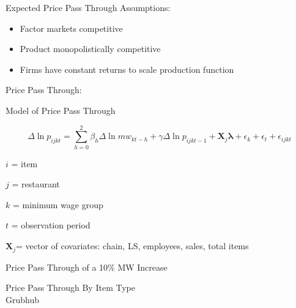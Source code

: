 \documentclass[xcolor=table]{beamer}
\begin{document}
\begin{spacing}{1.2}
\begin{frame}{Expected Price Pass Through}
Assumptions:
\begin{itemize}
\item Factor markets competitive
\item Product monopolistically competitive
\item Firms have constant returns to scale production function
\end{itemize}

\bigskip

Price Pass Through:

\bigskip
{}

\bigskip
{}

\end{frame}

\begin{frame} {Model of Price Pass Through}

\begin{dmath}
\Delta \ln p_{ijkt} = \sum_{h=0}^{2}\beta_h \Delta \ln mw_{kt-h} +  \gamma \Delta \ln p_{ijkt-1}  + \boldsymbol{X}_j \boldsymbol{\lambda} + \epsilon_k + \epsilon_t + \epsilon_{ijkt}
\end{dmath}

$i$ = item

$j$ = restaurant

$k$ = minimum wage group

$t$ = observation period

$\boldsymbol{X}_j$= vector of covariates: chain, LS, employees, sales, total items

\end{frame}




\begin{frame}{Price Pass Through of a 10\% MW Increase}
\centering
\scriptsize

\end{frame}





\begin{frame}{Price Pass Through By Item Type \\ \small{Grubhub}}
\centering
\tiny

\end{frame}






\end{spacing}
\end{document}
